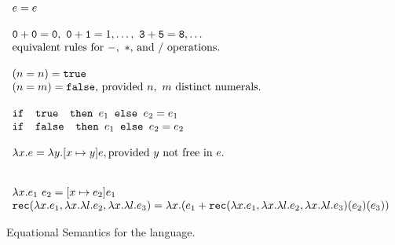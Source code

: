 \begin{figure}
\[
\begin{array}{lr}
e = e \\ \\
\texttt{0} + \texttt{0} = \texttt{0}, \ \texttt{0} + \texttt{1} = 1, \ldots, \ \texttt{3} + \texttt{5} = \texttt{8}, \ldots  \\
\text{equivalent rules for } -, \ * \text{, and } /\text{ operations.}
\\ \\
(n =n) = \texttt{true} \\ (n=m) = \texttt{false}\text{, provided } n, \ m \text{ distinct numerals.}\\ \\ 
\ifelse{\texttt{ true }}{e_1}{e_2} = e_1 \\
\ifelse{\texttt{ false }}{e_1}{e_2} = e_2 \\ \\ 
\lambda x.e = \lambda y.[x \mapsto y]e, \text{provided } y \text{ not free in } e. \\ \\ \\
\lambda x.e_1 \ e_2 = [x \mapsto e_2]e_1 \\
\texttt{rec}(\lambda x.e_1, \lambda x.\lambda l.e_2, \lambda x.\lambda l.e_3) = 
\lambda x.(e_1 + \texttt{rec}(\lambda x.e_1, \lambda x.\lambda l.e_2, \lambda x.\lambda l.e_3)(e_2)(e_3))
\end{array}
\]
\caption{Equational Semantics for the language.}
\label{fig:typing}
\end{figure}

